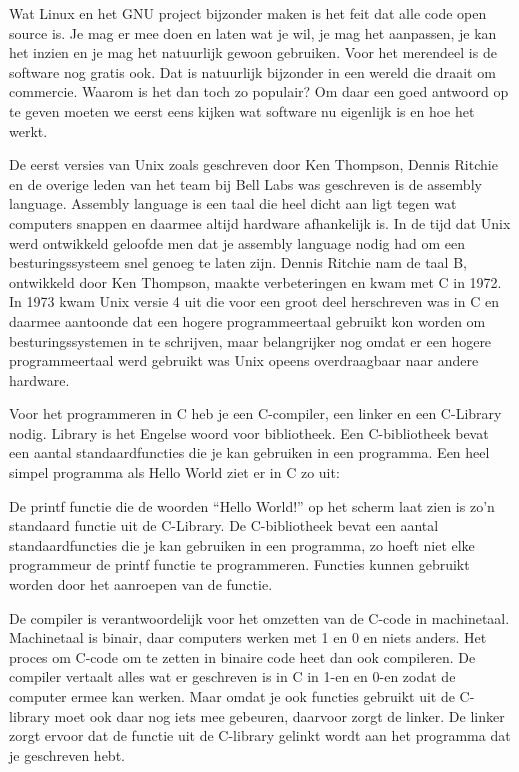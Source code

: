 Wat Linux en het GNU project bijzonder maken is het feit dat alle code open source is. Je mag er mee doen en laten wat
je wil, je mag het aanpassen, je kan het inzien en je mag het natuurlijk gewoon gebruiken. Voor het merendeel is de software nog gratis ook. Dat is
natuurlijk bijzonder in een wereld die draait om commercie. Waarom is het dan toch zo populair? Om daar een goed
antwoord op te geven moeten we eerst eens kijken wat software nu eigenlijk is en hoe het werkt.\par

De eerst versies van Unix zoals geschreven door Ken Thompson, Dennis Ritchie en de overige leden
van het team bij Bell Labs was geschreven is de assembly language. Assembly language is een taal die heel dicht aan ligt tegen
wat computers snappen en daarmee altijd hardware afhankelijk is. In de tijd dat Unix werd ontwikkeld geloofde men dat je
assembly language nodig had om een besturingssysteem snel genoeg te laten zijn. Dennis Ritchie nam de taal B, ontwikkeld
door Ken Thompson, maakte verbeteringen en kwam met C in
1972. In 1973 kwam Unix versie 4 uit die voor een groot deel herschreven was in C en daarmee aantoonde dat een hogere
programmeertaal gebruikt kon worden om besturingssystemen in te schrijven, maar belangrijker nog omdat er een hogere
programmeertaal werd gebruikt was Unix opeens overdraagbaar naar andere hardware.\par

Voor het programmeren in C heb je een C-compiler, een linker en een C-Library nodig. Library is het Engelse woord voor
bibliotheek. Een C-bibliotheek bevat een aantal standaardfuncties die je kan gebruiken in een programma.
Een heel simpel programma als Hello World ziet er in C zo uit:



De printf functie die de woorden ``Hello World!'' op het scherm laat zien is zo'n standaard functie uit de C-Library.
 De C-bibliotheek bevat een aantal standaardfuncties die je kan gebruiken in een programma, zo hoeft niet
elke programmeur de printf functie te programmeren. Functies kunnen gebruikt worden door het aanroepen van de functie.

De compiler is verantwoordelijk voor het omzetten van de C-code in machinetaal. Machinetaal is binair, daar computers werken met 1 en 0 en niets anders.
Het proces om C-code om te zetten in binaire code heet dan ook compileren. De compiler vertaalt alles wat er geschreven is in C in 1-en en 0-en zodat de computer ermee kan werken. Maar omdat je ook functies gebruikt uit de C-library moet ook daar nog iets mee gebeuren, daarvoor zorgt de linker. De linker zorgt ervoor dat de functie uit de C-library gelinkt wordt aan het programma dat je geschreven hebt.


